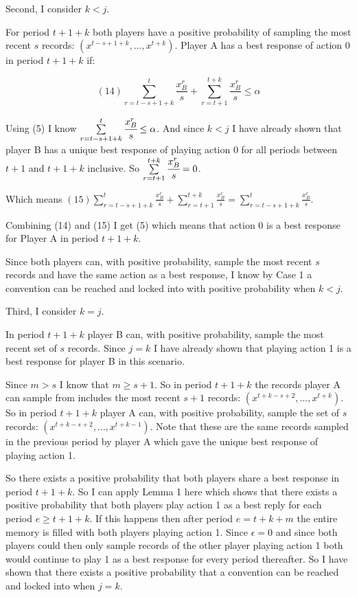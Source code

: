 \documentclass{article}
\begin{document}
\vskip18pt

Second, I consider $k<j$.

\vskip6pt

For period $t+1+k$ both players have a positive probability of sampling the most recent $s$ records: $(x^{t-s+1+k},...,x^{t+k})$. Player A has a best response of action 0 in period $t+1+k$ if:

$$(14) \sum\limits_{r=t-s+1+k}^{t}\frac{x^r_B}{s}+\sum\limits_{r=t+1}^{t+k} \frac{x^r_B}{s} \leq \alpha$$

Using (5) I know $\sum\limits_{r=t-s+1+k}^{t}\cfrac{x^r_B}{s} \leq \alpha$. And since $k<j$ I have already shown that player B has a unique best response of playing action 0 for all periods between $t+1$ and $t+1+k$ inclusive. So $\sum\limits_{r=t+1}^{t+k} \cfrac{x^r_B}{s}=0$.

Which means $(15) \sum\limits_{r=t-s+1+k}^{t}\frac{x^r_B}{s}+\sum\limits_{r=t+1}^{t+k} \frac{x^r_B}{s}=\sum\limits_{r=t-s+1+k}^{t}\frac{x^r_B}{s}$.

Combining (14) and (15) I get (5) which means that action 0 is a best response for Player A in period $t+1+k$.

\vskip6pt

Since both players can, with positive probability, sample the most recent $s$ records and have the same action as a best response, I know by Case 1 a convention can be reached and locked into with positive probability when $k<j$.

\vskip18pt

Third, I consider $k=j$.

\vskip6pt

In period $t+1+k$ player B can, with positive probability, sample the most recent set of $s$ records. Since $j=k$ I have already shown that playing action 1 is a best response for player B in this scenario.

\vskip6pt

Since $m>s$ I know that $m \geq s+1$. So in period $t+1+k$ the records player A can sample from includes the most recent $s+1$ records: $(x^{t+k-s+2},...,x^{t+k})$. So in period $t+1+k$ player A can, with positive probability, sample the set of $s$ records: $(x^{t+k-s+2},...,x^{t+k-1})$. Note that these are the same records sampled in the previous period by player A which gave the unique best response of playing action 1.

\vskip6pt

So there exists a positive probability that both players share a best response in period $t+1+k$. So I can apply Lemma 1 here which shows that there exists a positive probability that both players play action 1 as a best reply for each period $e \geq t+1+k$. If this happens then after period $e=t+k+m$ the entire memory is filled with both players playing action 1. Since $\epsilon=0$ and since both players could then only sample records of the other player playing action 1 both would continue to play 1 as a best response for every period thereafter. So I have shown that there exists a positive probability that a convention can be reached and locked into when $j=k$. 
\end{document}
